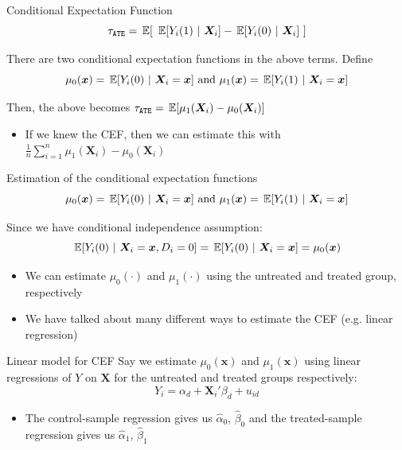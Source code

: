 \documentclass[aspectratio=169,t,11pt,table]{beamer}
\begin{document}
\begin{frame}{Conditional Expectation Function}
  $$
  \tau_{\texttt{ATE}} = \expec{\ \expec{Y_i(1)}{\bm{X}_i} - \expec{Y_i(0)}{\bm{X}_i} \ }
  $$

  There are two conditional expectation functions in the above terms. Define
  $$
    \mu_0(\bm{x}) = \expec{Y_i(0)}{\bm{X}_i = \bm{x}} 
    \text{ and }
    \mu_1(\bm{x}) = \expec{Y_i(1)}{\bm{X}_i = \bm{x}}
  $$

  \pause
  \bigskip
  Then, the above becomes $\tau_{\texttt{ATE}} = \expec{ \mu_1(\bm{X}_i) - \mu_0(\bm{X}_i) }$
  \begin{itemize}
    \item If we knew the CEF, then we can estimate this with $\frac{1}{n} \sum_{i=1}^n \mu_1(\bm{X}_i) - \mu_0(\bm{X}_i)$
  \end{itemize}
\end{frame}

\begin{frame}{Estimation of the conditional expectation functions}
  \vspace*{-\bigskipamount}
  $$
    \mu_0(\bm{x}) = \expec{Y_i(0)}{\bm{X}_i = \bm{x}} 
    \text{ and }
    \mu_1(\bm{x}) = \expec{Y_i(1)}{\bm{X}_i = \bm{x}}
  $$

  \bigskip
  Since we have conditional independence assumption: 
  $$
    \expec{Y_i(0)}{\bm{X}_i = \bm{x}, D_i = 0} = \expec{Y_i(0)}{\bm{X}_i = \bm{x}} = \mu_0(\bm{x})
  $$ 
  \begin{itemize}
    \item We can estimate $\mu_0(\cdot)$ and $\mu_1(\cdot)$ using the untreated and treated group, respectively

    \item We have talked about many different ways to estimate the CEF (e.g. linear regression)
  \end{itemize}
\end{frame}

\begin{frame}{Linear model for CEF}
  Say we estimate $\mu_0(\bm{x})$ and $\mu_1(\bm{x})$ using linear regressions of $Y$ on $\bm{X}$ for the untreated and treated groups respectively:
  $$
    Y_i = \alpha_{d} + \bm{X}_{i}' \beta_d + u_{id}
  $$
  \begin{itemize}
    \item The control-sample regression gives us $\hat{\alpha}_{0}$, $\hat{\beta}_{0}$ and the treated-sample regression gives us $\hat{\alpha}_{1}$, $\hat{\beta}_{1}$
  \end{itemize}
\end{frame}
\end{document}
